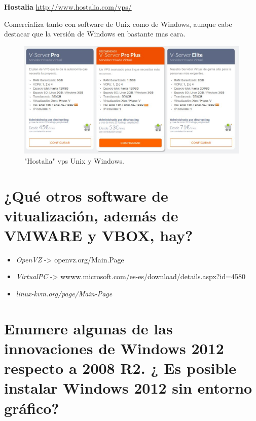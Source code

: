 \textbf{Hostalia}
\url{http://www.hostalia.com/vps/}

Comercializa tanto con software de Unix como de Windows, aunque cabe destacar que la versión de Windows en bastante mas cara.
 
\begin{figure}[H]
\begin{center}
\includegraphics[scale=0.4]{imagenes/cuestion2-4.eps}
\caption{ "Hostalia" vps Unix y Windows.}
\end{center}
\end{figure}



\section{ ¿Qué otros software de vitualización, además de VMWARE y VBOX, hay? }
\begin{itemize}
\item \textit{OpenVZ} -> openvz.org/Main.Page
\item \textit{VirtualPC} -> wwww.microsoft.com/es-es/download/details.aspx?id=4580

\item \textit{linux-kvm.org/page/Main-Page}

\end{itemize}


\section{ Enumere algunas de las innovaciones de Windows 2012 respecto a 2008 R2. ¿ Es posible instalar Windows 2012 sin entorno gráfico?  }


